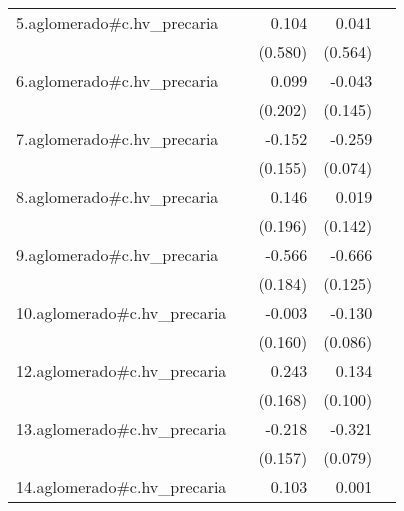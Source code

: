 {\begin{longtable}{l*{4}{D{.}{.}{-1}}}
\addlinespace
5.aglomerado#c.hv\_precaria&                     &       0.104         &       0.041         &                     \\
            &                     &     (0.580)         &     (0.564)         &                     \\
\addlinespace
6.aglomerado#c.hv\_precaria&                     &       0.099         &      -0.043         &                     \\
            &                     &     (0.202)         &     (0.145)         &                     \\
\addlinespace
7.aglomerado#c.hv\_precaria&                     &      -0.152         &      -0.259\sym{***}&                     \\
            &                     &     (0.155)         &     (0.074)         &                     \\
\addlinespace
8.aglomerado#c.hv\_precaria&                     &       0.146         &       0.019         &                     \\
            &                     &     (0.196)         &     (0.142)         &                     \\
\addlinespace
9.aglomerado#c.hv\_precaria&                     &      -0.566\sym{**} &      -0.666\sym{***}&                     \\
            &                     &     (0.184)         &     (0.125)         &                     \\
\addlinespace
10.aglomerado#c.hv\_precaria&                     &      -0.003         &      -0.130         &                     \\
            &                     &     (0.160)         &     (0.086)         &                     \\
\addlinespace
12.aglomerado#c.hv\_precaria&                     &       0.243         &       0.134         &                     \\
            &                     &     (0.168)         &     (0.100)         &                     \\
\addlinespace
13.aglomerado#c.hv\_precaria&                     &      -0.218         &      -0.321\sym{***}&                     \\
            &                     &     (0.157)         &     (0.079)         &                     \\
\addlinespace
14.aglomerado#c.hv\_precaria&                     &       0.103         &       0.001         &                     \\

\end{longtable}}
